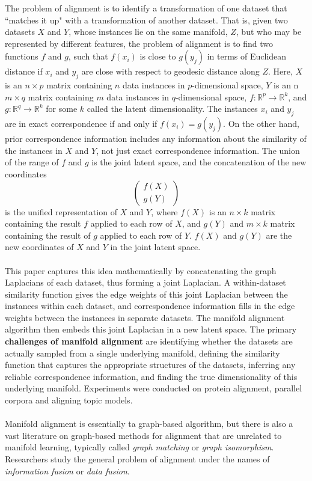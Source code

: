 \documentclass[]{article}
\begin{document}
		The problem of alignment is to identify a transformation of one dataset that ``matches it up" with a transformation of another dataset.  That is, given two datasets $X$ and $Y$, whose instances lie on the same manifold, $Z$, but who may be represented by different features, the problem of alignment is to find two functions $f$ and $g$, such that $f(x_i)$ is close to $g(y_j)$ in terms of Euclidean distance if $x_i$ and $y_j$ are close with respect to geodesic distance along $Z$.  Here, $X$ is an $n \times p$ matrix containing $n$ data instances in $p$-dimensional space, $Y$ is an n$m\times q$ matrix containing $m$ data instances in $q$-dimensional space, $f:\mathbb{R}^{p}\rightarrow\mathbb{R}^{k}$, and $g:\mathbb{R}^{q}\rightarrow\mathbb{R}^{k}$ for some $k$ called the latent dimensionality.  The instances $x_i$ and $y_j$ are in exact correspondence if and only if $f(x_i)=g(y_j)$.  On the other hand, prior correspondence information includes any information about the similarity of the instances in $X$ and $Y$, not just exact correspondence information. The union of the range of $f$ and $g$ is the joint latent space, and the concatenation of the new coordinates \[ \left( \begin{array}{cc}
		f(X) \\
		g(Y)  \end{array} \right)\] 
		is the unified representation of $X$ and $Y$, where $f(X)$ is an $n\times k$ matrix containing the result $f$ applied to each row of $X$, and $g(Y)$ and $m \times k$ matrix containing the result of $g$ applied to each row of $Y$.  $f(X)$ and $g(Y)$ are the new coordinates of $X$ and $Y$ in the joint latent space.\\ \\
			
		This paper captures this idea mathematically by concatenating the graph Laplacians of each dataset, thus forming a joint Laplacian.  A within-dataset similarity function gives the edge weights of this joint Laplacian between the instances within each dataset, and correspondence information fills in the edge weights between the instances in separate datasets.  The manifold alignment algorithm then embeds this joint Laplacian in a new latent space.  The primary \textbf{challenges of manifold alignment} are identifying whether the datasets are actually sampled from a single underlying manifold, defining the similarity function that captures the appropriate structures of the datasets, inferring any reliable correspondence information, and finding the true dimensionality of this underlying manifold. Experiments were conducted on protein alignment, parallel corpora and aligning topic models. \\ \\Manifold alignment is essentially ta graph-based algorithm, but there is also a vast literature on graph-based methods for alignment that are unrelated to manifold learning, typically called \textit{graph matching} or \textit{graph isomorphism}. Researchers study the general problem of alignment under the names of \textit{information fusion} or \textit{data fusion}. \\
	
\end{document}
